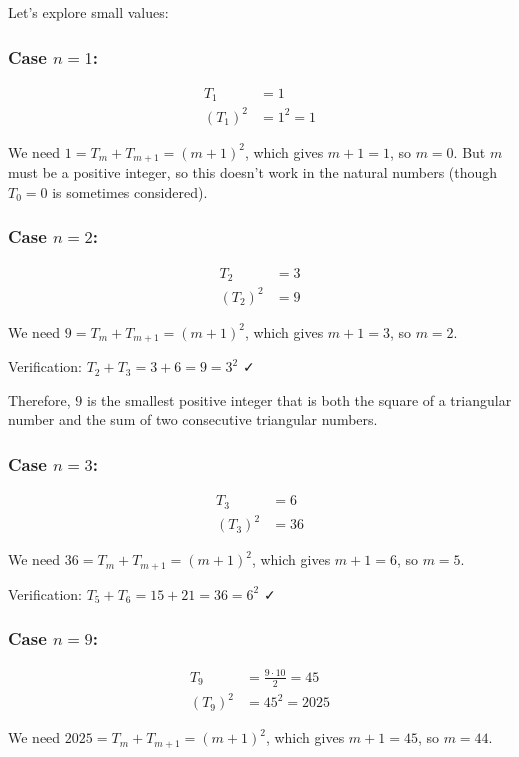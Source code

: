 \documentclass[12pt]{article}
\begin{document}
Let's explore small values:

\subsubsection*{Case $n = 1$:}
\begin{align*}
T_1 &= 1 \\
(T_1)^2 &= 1^2 = 1
\end{align*}

We need $1 = T_m + T_{m+1} = (m+1)^2$, which gives $m+1 = 1$, so $m = 0$.
But $m$ must be a positive integer, so this doesn't work in the natural numbers (though $T_0 = 0$ is sometimes considered).

\subsubsection*{Case $n = 2$:}
\begin{align*}
T_2 &= 3 \\
(T_2)^2 &= 9
\end{align*}

We need $9 = T_m + T_{m+1} = (m+1)^2$, which gives $m+1 = 3$, so $m = 2$.

Verification: $T_2 + T_3 = 3 + 6 = 9 = 3^2$ ✓

Therefore, $\boxed{9}$ is the smallest positive integer that is both the square of a triangular number and the sum of two consecutive triangular numbers.

\subsubsection*{Case $n = 3$:}
\begin{align*}
T_3 &= 6 \\
(T_3)^2 &= 36
\end{align*}

We need $36 = T_m + T_{m+1} = (m+1)^2$, which gives $m+1 = 6$, so $m = 5$.

Verification: $T_5 + T_6 = 15 + 21 = 36 = 6^2$ ✓

\subsubsection*{Case $n = 9$:}
\begin{align*}
T_9 &= \frac{9 \cdot 10}{2} = 45 \\
(T_9)^2 &= 45^2 = 2025
\end{align*}

We need $2025 = T_m + T_{m+1} = (m+1)^2$, which gives $m+1 = 45$, so $m = 44$.
\end{document}

